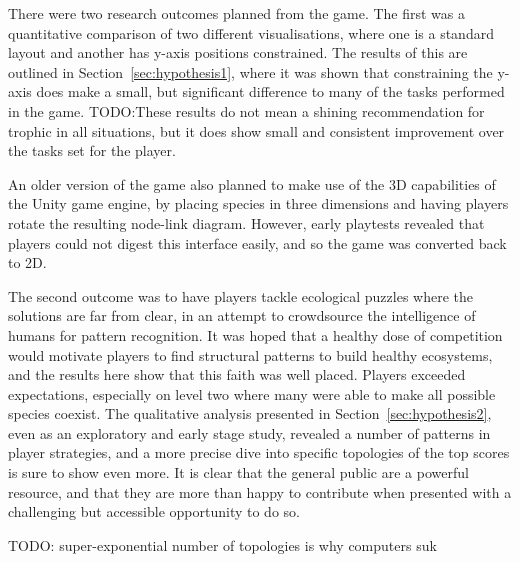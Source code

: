 There were two research outcomes planned from the game. The first was a quantitative comparison of two different visualisations, where one is a standard layout and another has y-axis positions constrained.  The results of this are outlined in Section~\ref{sec:hypothesis1}, where it was shown that constraining the y-axis does make a small, but significant difference to many of the tasks performed in the game.
TODO:These results do not mean a shining recommendation for trophic in all situations, but it does show small and consistent improvement over the tasks set for the player.

An older version of the game also planned to make use of the 3D capabilities of the Unity game engine, by placing species in three dimensions and having players rotate the resulting node-link diagram. However, early playtests revealed that players could not digest this interface easily, and so the game was converted back to 2D.

The second outcome was to have players tackle ecological puzzles where the solutions are far from clear, in an attempt to crowdsource the intelligence of humans for pattern recognition. It was hoped that a healthy dose of competition would motivate players to find structural patterns to build healthy ecosystems, and the results here show that this faith was well placed. Players exceeded expectations, especially on level two where many were able to make all possible species coexist.
The qualitative analysis presented in Section~\ref{sec:hypothesis2}, even as an exploratory and early stage study, revealed a number of patterns in player strategies, and a more precise dive into specific topologies of the top scores is sure to show even more.
It is clear that the general public are a powerful resource, and that they are more than happy to contribute when presented with a challenging but accessible opportunity to do so.

TODO: super-exponential number of topologies is why computers suk



